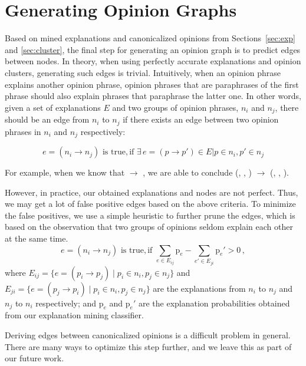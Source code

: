 \section{Generating Opinion Graphs} \label{sec:graph}

Based on mined explanations and canonicalized opinions from Sections~\ref{sec:exp} and \ref{sec:cluster}, the final step for generating an opinion  graph is to predict edges between nodes. In theory, when using perfectly accurate explanations and opinion clusters, generating such edges is trivial. Intuitively, when an opinion phrase explains another opinion phrase, opinion phrases that are paraphrases of the first phrase should also explain phrases that paraphrase the latter one. In other words, given a set of explanations $E$ and two groups of opinion phrases, $n_i$ and $n_j$, there should be an edge from $n_i$ to $n_j$ if there exists an edge between two opinion phrases in $n_i$ and $n_j$ respectively:

\vspace{-1mm}
\[e=(n_i\rightarrow n_j) \text{~is~true}, \text{if~} \exists \, e=(p\rightarrow p')\in E|  p\in n_i, p'\in n_j\]
\vspace{-1mm}

For example, when we know that  $\rightarrow$ , we are able to conclude (, , )  $\rightarrow$ (, , ).

However, in practice, our obtained explanations and nodes are not perfect. Thus, we may get a lot of false positive edges based on the above criteria. To minimize the false positives, we use a simple heuristic to further prune the edges, which is based on the observation that two groups of opinions seldom explain each other at the same time. 
\vspace{-1mm}
\[e=(n_i\rightarrow n_j) \text{~is~true}, \text{if~} \sum_{e\in E_{ij}} \mathrm{p}_e - \sum_{e'\in E_{ji}} \mathrm{p}_e' > 0\, ,\]
where $E_{ij} = \{e=(p_i\rightarrow p_j) \mid p_i\in n_i, p_j\in n_j\}$ and $E_{ji} = \{e=(p_j\rightarrow p_i) \mid p_i\in n_i, p_j\in n_j\}$ are the explanations from $n_i$ to $n_j$ and $n_j$ to $n_i$ respectively; and $\mathrm{p}_e$ and $\mathrm{p}_e'$ are the explanation probabilities obtained from our explanation mining classifier. 

Deriving edges between canonicalized opinions is a difficult problem in general. There are many ways to optimize this step further, and we leave this as part of our future work.
